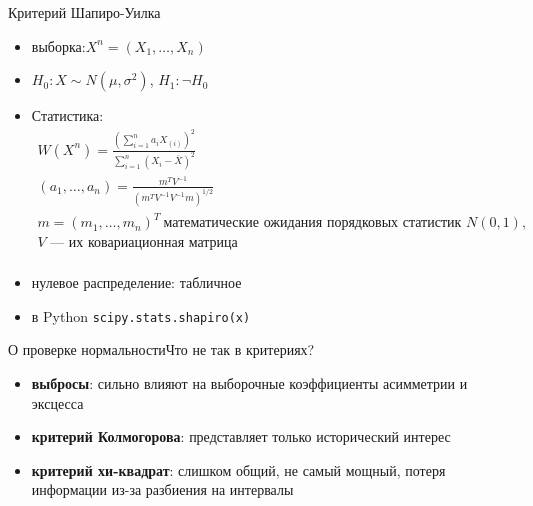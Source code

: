 \documentclass[11pt,pdf,utf8,hyperref={unicode},aspectratio=169]{beamer}
\begin{document}
\begin{frame}{Критерий Шапиро-Уилка}
\begin{itemize}
       \item  выборка:$X^n=\left(X_1,\ldots,X_n\right)$
       \item $H_0\colon X \sim N\left(\mu,\sigma^2\right)$,\qquad
        $H_1\colon \lnot H_0$
        \item Статистика:
        \begin{gather*}
            W \left(X^n\right) = \frac{\left(\sum\limits_{i=1}^n a_i X_{(i)}\right)^2}{\sum\limits_{i=1}^n\left(X_i-\bar{X}\right)^2}
            \\
            \left(a_1,\ldots,a_n\right) = \frac{m^TV^{-1}}{\left(m^TV^{-1}V^{-1}m\right)^{1/2}}
            \\
            m=\left(m_1,\ldots,m_n\right)^T~\text{математические ожидания порядковых статистик $N(0,1)$}, \\
            V \text{ --- их ковариационная матрица} \\
        \end{gather*}
        \item нулевое распределение:       табличное
        \item  в Python \alert{\texttt{scipy.stats.shapiro(x)}}
\end{itemize}
\end{frame}

\begin{frame}{О проверке нормальности}{Что не так в критериях?}
    \begin{itemize}
        \large
        \item \textbf{выбросы}: сильно влияют на выборочные коэффициенты асимметрии и эксцесса
        \bigskip
        \item \textbf{критерий Колмогорова}: представляет только исторический интерес
        \bigskip
        \item \textbf{критерий хи-квадрат}: слишком общий, не самый мощный, потеря информации из-за разбиения на интервалы
    \end{itemize}
\end{frame}
\end{document}
